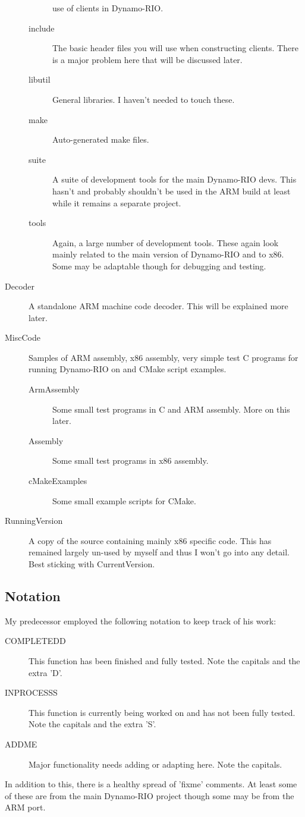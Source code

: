 \documentclass[a4paper]{article}
\begin{document}
\begin{description}
\begin{description}
use of clients in
        Dynamo-RIO.
        \item[include] The basic header files you will use when 
constructing clients.
        There is a major problem here that will be discussed later.
        \item[libutil] General libraries. I haven't needed to touch 
these.
        \item[make] Auto-generated make files.
        \item[suite] A suite of development tools for the main 
Dynamo-RIO devs. This
        hasn't and probably shouldn't be used in the ARM build at least 
while it remains
        a separate project.
        \item[tools] Again, a large number of development tools. These 
again look mainly
        related to the main version of Dynamo-RIO and to x86. Some may 
be adaptable
        though for debugging and testing.
        \end{description}
\item[Decoder] A standalone ARM machine code decoder. This will be 
explained
more later.
\item[MiscCode] Samples of ARM assembly, x86 assembly, very simple test 
C
programs for running Dynamo-RIO on and CMake script examples.
\begin{description}
        \item[ArmAssembly] Some small test programs in C and ARM 
assembly. More on
        this later.
        \item[Assembly] Some small test programs in x86 assembly.
        \item[cMakeExamples] Some small example scripts for CMake.
\end{description}
\item[RunningVersion] A copy of the source containing mainly x86 
specific code.
This has remained largely un-used by myself and thus I won't go into any 
detail.
Best sticking with CurrentVersion.
\end{description}

\subsection{Notation}
My predecessor employed the following notation to keep track of his work:
\begin{description}
\item[COMPLETEDD] This function has been finished and fully tested. Note the
capitals and the extra 'D'.
\item[INPROCESSS] This function is currently being worked on and has not been
fully tested. Note the capitals and the extra 'S'.
\item[ADDME] Major functionality needs adding or adapting here. Note the
capitals.
\end{description}
In addition to this, there is a healthy spread of 'fixme' comments. At least
some of these are from the main Dynamo-RIO project though some may be from the
ARM port.
\end{document}
